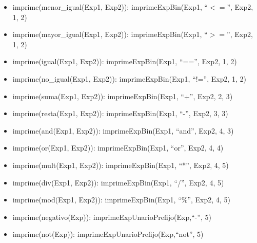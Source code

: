 \documentclass[11pt]{article}
\begin{document}
\begin{itemize}
            \item imprime(menor\_igual(Exp1, Exp2)):
                \subitem imprimeExpBin(Exp1, “$<=$”, Exp2, 1, 2)
            
            \item imprime(mayor\_igual(Exp1, Exp2)):
                \subitem imprimeExpBin(Exp1, “$>=$”, Exp2, 1, 2)
            
            \item imprime(igual(Exp1, Exp2)):
                \subitem imprimeExpBin(Exp1, “==”, Exp2, 1, 2)
            
            \item imprime(no\_igual(Exp1, Exp2)):
                \subitem imprimeExpBin(Exp1, “!=”, Exp2, 1, 2)
            
            \item imprime(suma(Exp1, Exp2)):
                \subitem imprimeExpBin(Exp1, “+”, Exp2, 2, 3)
            
            \item imprime(resta(Exp1, Exp2)):
                \subitem imprimeExpBin(Exp1, “-”, Exp2, 3, 3)
            
            \item imprime(and(Exp1, Exp2)):
                \subitem imprimeExpBin(Exp1, “and”, Exp2, 4, 3)
            
            \item imprime(or(Exp1, Exp2)):
                \subitem imprimeExpBin(Exp1, “or”, Exp2, 4, 4)
            
            \item imprime(mult(Exp1, Exp2)):
                \subitem imprimeExpBin(Exp1, “*”, Exp2, 4, 5)
            
            \item imprime(div(Exp1, Exp2)):
                \subitem imprimeExpBin(Exp1, “/”, Exp2, 4, 5)
            
            \item imprime(mod(Exp1, Exp2)):
                \subitem imprimeExpBin(Exp1, “\%”, Exp2, 4, 5)
            
            \item imprime(negativo(Exp)):
                \subitem imprimeExpUnarioPrefijo(Exp,“-”, 5)
            
            \item imprime(not(Exp)):
                \subitem imprimeExpUnarioPrefijo(Exp,“not”, 5)
            

\end{itemize}
\end{document}
